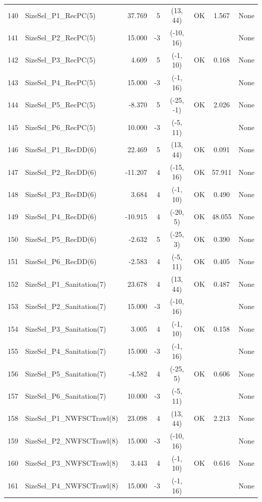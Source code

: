 \documentclass[12pt,]{article}
\begin{document}
\begin{landscape}
\begin{longtable}{rlrrcccl}
  140 & SizeSel\_P1\_RecPC(5) & 37.769 & 5 & (13, 44) & OK & 1.567 & None \\ 
  141 & SizeSel\_P2\_RecPC(5) & 15.000 & -3 & (-10, 16) &  &  & None \\ 
  142 & SizeSel\_P3\_RecPC(5) & 4.609 & 5 & (-1, 10) & OK & 0.168 & None \\ 
  143 & SizeSel\_P4\_RecPC(5) & 15.000 & -3 & (-1, 16) &  &  & None \\ 
  144 & SizeSel\_P5\_RecPC(5) & -8.370 & 5 & (-25, -1) & OK & 2.026 & None \\ 
  145 & SizeSel\_P6\_RecPC(5) & 10.000 & -3 & (-5, 11) &  &  & None \\ 
  146 & SizeSel\_P1\_RecDD(6) & 22.469 & 5 & (13, 44) & OK & 0.091 & None \\ 
  147 & SizeSel\_P2\_RecDD(6) & -11.207 & 4 & (-15, 16) & OK & 57.911 & None \\ 
  148 & SizeSel\_P3\_RecDD(6) & 3.684 & 4 & (-1, 10) & OK & 0.490 & None \\ 
  149 & SizeSel\_P4\_RecDD(6) & -10.915 & 4 & (-20, 5) & OK & 48.055 & None \\ 
  150 & SizeSel\_P5\_RecDD(6) & -2.632 & 5 & (-25, 3) & OK & 0.390 & None \\ 
  151 & SizeSel\_P6\_RecDD(6) & -2.583 & 4 & (-5, 11) & OK & 0.405 & None \\ 
  152 & SizeSel\_P1\_Sanitation(7) & 23.678 & 4 & (13, 44) & OK & 0.487 & None \\ 
  153 & SizeSel\_P2\_Sanitation(7) & 15.000 & -3 & (-10, 16) &  &  & None \\ 
  154 & SizeSel\_P3\_Sanitation(7) & 3.005 & 4 & (-1, 10) & OK & 0.158 & None \\ 
  155 & SizeSel\_P4\_Sanitation(7) & 15.000 & -3 & (-1, 16) &  &  & None \\ 
  156 & SizeSel\_P5\_Sanitation(7) & -4.582 & 4 & (-25, 5) & OK & 0.606 & None \\ 
  157 & SizeSel\_P6\_Sanitation(7) & 10.000 & -3 & (-5, 11) &  &  & None \\ 
  158 & SizeSel\_P1\_NWFSCTrawl(8) & 23.098 & 4 & (13, 44) & OK & 2.213 & None \\ 
  159 & SizeSel\_P2\_NWFSCTrawl(8) & 15.000 & -3 & (-10, 16) &  &  & None \\ 
  160 & SizeSel\_P3\_NWFSCTrawl(8) & 3.443 & 4 & (-1, 10) & OK & 0.616 & None \\ 
  161 & SizeSel\_P4\_NWFSCTrawl(8) & 15.000 & -3 & (-1, 16) &  &  & None \\ 

\end{longtable}
\end{landscape}
\end{document}
